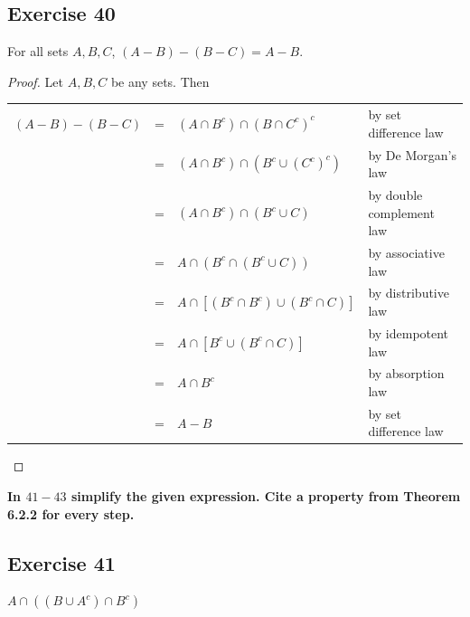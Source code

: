 \documentclass[14pt]{extarticle}
\newcommand{\cy}{\color{cyan}}
\begin{document}
\subsection{Exercise 40}
For all sets $A, B, C$, \((A - B) - (B - C) = A - B\).

\begin{proof}
Let $A,B,C$ be any sets. Then
\begin{center}
\begin{tabular}{rcll}
\((A - B) - (B - C)\) & = & \((A \cap B^c) \cap (B \cap C^c)^c\) & {\cy by set difference law} \\
\(\) & = & \((A \cap B^c) \cap (B^c \cup (C^c)^c)\) & {\cy by De Morgan's law} \\
\(\) & = & \((A \cap B^c) \cap (B^c \cup C)\) & {\cy by double complement law} \\
\(\) & = & \(A \cap (B^c \cap (B^c \cup C))\) & {\cy by associative law} \\
\(\) & = & \(A \cap [(B^c \cap B^c) \cup (B^c \cap C)]\) & {\cy by distributive law} \\
\(\) & = & \(A \cap [B^c \cup (B^c \cap C)]\) & {\cy by idempotent law} \\
\(\) & = & \(A \cap B^c\) & {\cy by absorption law} \\
\(\) & = & \(A - B\) & {\cy by set difference law}
\end{tabular}
\end{center}
\end{proof}

{\bf \cy In $41-43$ simplify the given expression. Cite a property from Theorem 6.2.2 for every step.}

\subsection{Exercise 41}
\(A \cap ((B \cup A^c) \cap B^c)\)
\end{document}
